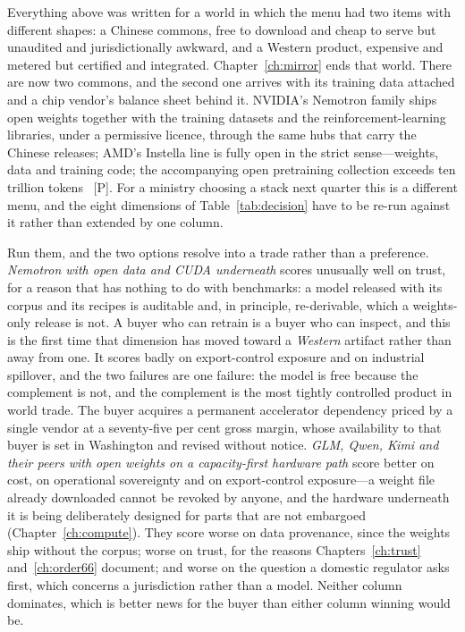 Everything above was written for a world in which the menu had two items with different shapes: a Chinese commons, free to download and cheap to serve but unaudited and jurisdictionally awkward, and a Western product, expensive and metered but certified and integrated. Chapter~\ref{ch:mirror} ends that world. There are now two commons, and the second one arrives with its training data attached and a chip vendor's balance sheet behind it. NVIDIA's Nemotron family ships open weights together with the training datasets and the reinforcement-learning libraries, under a permissive licence, through the same hubs that carry the Chinese releases; AMD's Instella line is fully open in the strict sense---weights, data and training code; the accompanying open pretraining collection exceeds ten trillion tokens~\cite{nemotron,amd-open} [P]. For a ministry choosing a stack next quarter this is a different menu, and the eight dimensions of Table~\ref{tab:decision} have to be re-run against it rather than extended by one column.

Run them, and the two options resolve into a trade rather than a preference. \emph{Nemotron with open data and CUDA underneath} scores unusually well on trust, for a reason that has nothing to do with benchmarks: a model released with its corpus and its recipes is auditable and, in principle, re-derivable, which a weights-only release is not. A buyer who can retrain is a buyer who can inspect, and this is the first time that dimension has moved toward a \emph{Western} artifact rather than away from one. It scores badly on export-control exposure and on industrial spillover, and the two failures are one failure: the model is free because the complement is not, and the complement is the most tightly controlled product in world trade. The buyer acquires a permanent accelerator dependency priced by a single vendor at a seventy-five per cent gross margin, whose availability to that buyer is set in Washington and revised without notice. \emph{GLM, Qwen, Kimi and their peers with open weights on a capacity-first hardware path} score better on cost, on operational sovereignty and on export-control exposure---a weight file already downloaded cannot be revoked by anyone, and the hardware underneath it is being deliberately designed for parts that are not embargoed (Chapter~\ref{ch:compute}). They score worse on data provenance, since the weights ship without the corpus; worse on trust, for the reasons Chapters~\ref{ch:trust} and~\ref{ch:order66} document; and worse on the question a domestic regulator asks first, which concerns a jurisdiction rather than a model. Neither column dominates, which is better news for the buyer than either column winning would be.

